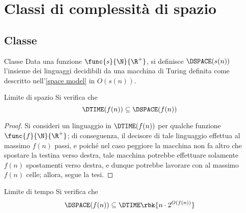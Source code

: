 \documentclass[a4paper, 12pt]{report}
\begin{document}
    \section{Classi di complessità di spazio}

    \subsection{Classe \DSPACE}

    \begin{frameddefn}{Classe \DSPACE}
        Data una funzione $\func{s}{\N}{\R^+}$, si definisce  $\DSPACE(s(n))$ l'insieme dei linguaggi decidibili da una macchina di Turing definita come descritto nell'\cref{space model} in $O(s(n))$.
    \end{frameddefn}

    \begin{framedthm}[label={dtime in dspace}]{Limite di spazio}
        Si verifica che $$\DTIME(f(n)) \subseteq \DSPACE(f(n))$$
    \end{framedthm}

    \begin{proof}
        Si consideri un linguaggio in $\DTIME(f(n))$ per qualche funzione $\func{f}{\N}{\R^+}$; di conseguenza, il decisore di tale linguaggio effettua al massimo $f(n)$ passi, e poiché nel caso peggiore la macchina non fa altro che spostare la testina verso destra, tale macchina potrebbe effettuare solamente $f(n)$ spostamenti verso destra, e dunque potrebbe lavorare con al massimo $f(n)$ celle; allora, segue la tesi.
    \end{proof}

    \begin{framedthm}[label={dspace in dtime}]{Limite di tempo}
        Si verifica che $$\DSPACE(f(n)) \subseteq \DTIME \rbk{n \cdot 2^{O(f(n))}}$$
    \end{framedthm}
\end{document}
